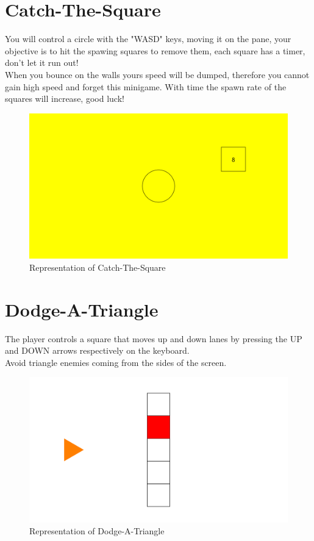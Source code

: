 \documentclass[a4paper,12pt]{report}
\begin{document}
\section*{Catch-The-Square}
You will control a circle with the "WASD" keys, moving it on the pane, your objective is to hit the spawing squares to remove them, each square has a timer, don't let it run out!\\
When you bounce on the walls yours speed will be dumped, therefore you cannot gain high speed and forget this minigame.
With time the spawn rate of the squares will increase, good luck!
\begin{figure}[H]
	\centering{}
	\includegraphics[width=330pt]{res/Cts.png}
	\caption{Representation of Catch-The-Square}
\end{figure}
\pagebreak

\section*{Dodge-A-Triangle}
The player controls a square that moves up and down lanes by pressing the UP and DOWN arrows respectively on the keyboard.\\
Avoid triangle enemies coming from the sides of the screen.
\begin{figure}[H]
	\centering{}
	\includegraphics[width=330pt]{res/Dat.png}
	\caption{Representation of Dodge-A-Triangle}
\end{figure}
\end{document}
